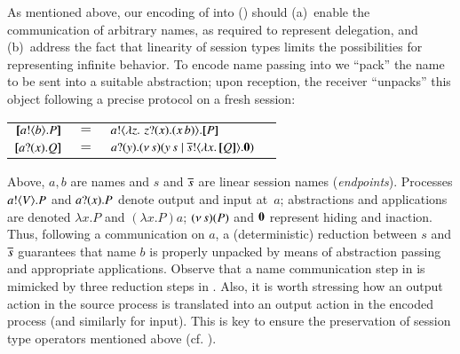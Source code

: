
As mentioned above, 
our encoding of \HOp into \HO () should 
(a)~enable the communication of arbitrary names, as required to represent delegation,
and 
(b)~address the fact that linearity of session types limits the 
possibilities for representing infinite behavior. 
To encode name passing into \HO 
we ``pack''
the name to be sent into a suitable abstraction; 
upon reception, the receiver ``unpacks'' this object following a precise protocol on a fresh  session:
\begin{center}
\begin{tabular}{rcll}
  $[\!\![a ! \langle b \rangle . P]\!\!]$	&$=$&	$a ! \langle  \lambda z.\,\,z ? (x) . (x\, {b})  \rangle . [\!\![P]\!\!]$ \\
  $[\!\![a ? (x) . Q]\!\!]$	&$=$&	$a ? (y) . (\nu\, s)(y\, {s} \;|\; \overline{s} ! \langle \lambda x.\,[\!\![Q]\!\!] \rangle . \mathbf{0})$
\end{tabular}
\end{center}
Above, 
$a,b$ are names and $s$ and $\overline{s}$ are 
linear session names (\emph{endpoints}).
Processes $a ! \langle V \rangle . P$ and 
$a ? (x) . P$ denote output and input at~$a$;   
abstractions and applications are denoted
$\lambda x.P$ and $(\lambda x.P)a$; %
$(\nu\, s)(P)$ and $\mathbf{0}$ represent hiding and inaction. %
Thus, following a communication on $a$, %
a (deterministic) reduction between  
$s$ and $\overline{s}$ guarantees that name $b$ is properly unpacked by means of abstraction passing
and appropriate applications.
Observe that a name communication step in \HOp is mimicked by three reduction steps in \HO.
Also, it is worth stressing how an output action in the source process is translated into an output action in the encoded process (and similarly for input).
This is key to ensure the preservation of session type operators mentioned above (cf. ).

